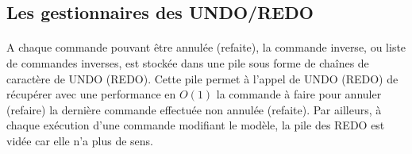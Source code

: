 \documentclass[a4paper, 12pts]{article}
\begin{document}
\subsection{Les gestionnaires des UNDO/REDO}
\paragraph{}
A chaque commande pouvant être annulée (refaite), la commande inverse, ou liste de commandes inverses, est stockée dans une pile sous forme de chaînes de caractère de UNDO (REDO). Cette pile permet à l'appel de UNDO (REDO) de récupérer avec une performance en \(O(1)\) la commande à faire pour annuler (refaire) la dernière commande effectuée non annulée (refaite). Par ailleurs, à chaque exécution d'une commande modifiant le modèle, la pile des REDO est vidée car elle n'a plus de sens.
\end{document}
